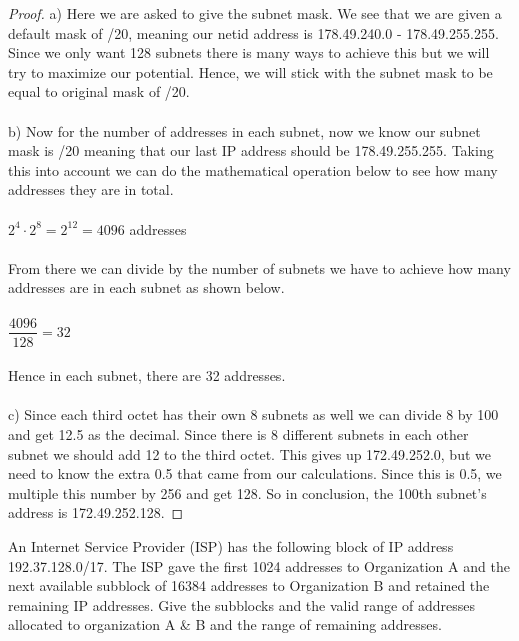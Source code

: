 \documentclass[12pt]{article}
\newenvironment{exercise}[2][Exercise]{\begin{trivlist}
\item[\hskip \labelsep {\bfseries #1}\hskip \labelsep {\bfseries #2.}]}{\end{trivlist}}
\begin{document}
\begin{proof}

a) Here we are asked to give the subnet mask. We see that we are given a default mask of /20, meaning our netid address is 178.49.240.0 - 178.49.255.255. Since we only want 128 subnets there is many ways to achieve this but we will try to maximize our potential. Hence, we will stick with the subnet mask to be equal to original mask of /20. \\ \\
b) Now for the number of addresses in each subnet, now we know our subnet mask is /20 meaning that our last IP address should be 178.49.255.255. Taking this into account we can do the mathematical operation below to see how many addresses they are in total. \\ \\
$2^4 \cdot 2^8 = 2^12 = 4096$ addresses \\ \\
From there we can divide by the number of subnets we have to achieve how many addresses are in each subnet as shown below. \\ \\ 
$\dfrac{4096}{128} = 32$ \\ \\ 
Hence in each subnet, there are 32 addresses. \\ \\ 
c) Since each third octet has their own 8 subnets as well we can divide 8 by 100 and get 12.5 as the decimal. Since there is 8 different subnets in each other subnet we should add 12 to the third octet. This gives up 172.49.252.0, but we need to know the extra 0.5 that came from our calculations. Since this is 0.5, we multiple this number by 256 and get 128. So in conclusion, the 100th subnet's address is 172.49.252.128. 
\end{proof}

\begin{exercise}{12}
An Internet Service Provider (ISP) has the following block of IP address 192.37.128.0/17. The ISP gave the first 1024 addresses to Organization A and the next available subblock of 16384 addresses to Organization B and retained the remaining IP addresses. Give the subblocks and the valid range of addresses allocated to organization A \& B and the range of remaining addresses. 
\end{exercise}
\end{document}
